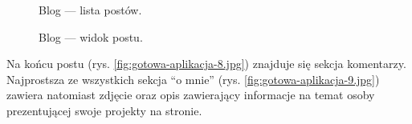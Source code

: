\documentclass[a4paper, 12pt, twoside]{article}
\numberwithin{figure}{section}
\begin{document}
\begin{sloppypar}
\begin{figure}[H] 
    \centering
   \caption{Blog --- lista postów.}
   \label{fig:gotowa-aplikacja-6.jpg} 
\end{figure}

\begin{figure}[H] 
    \centering
   \caption{Blog --- widok postu.}
   \label{fig:gotowa-aplikacja-7.jpg}
\end{figure}

Na końcu postu (rys. \ref{fig:gotowa-aplikacja-8.jpg}) znajduje się sekcja komentarzy. Najprostsza ze wszystkich sekcja ``o mnie'' (rys. \ref{fig:gotowa-aplikacja-9.jpg}) zawiera natomiast zdjęcie oraz opis zawierający informacje na temat osoby prezentującej swoje projekty na stronie. 


\end{sloppypar}
\end{document}
